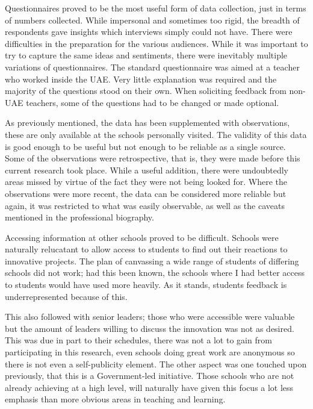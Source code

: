 Questionnaires proved to be the most useful form of data collection, just in terms of numbers collected. While impersonal and sometimes too rigid, the breadth of respondents gave insights which interviews simply could not have. There were difficulties in the preparation for the various audiences. While it was important to try to capture the same ideas and sentiments, there were inevitably multiple variations of questionnaires. The standard questionnaire was aimed at a teacher who worked inside the UAE. Very little explanation was required and the majority of the questions stood on their own. When soliciting feedback from non-UAE teachers, some of the questions had to be changed or made optional. 

As previously mentioned, the data has been supplemented with observations, these are only available at the schools personally visited. The validity of this data is good enough to be useful but not enough to be reliable as a single source. Some of the observations were retrospective, that is, they were made before this current research took place. While a useful addition, there were undoubtedly areas missed by virtue of the fact they were not being looked for. Where the observations were more recent, the data can be considered more reliable but again, it was restricted to what was easily observable, as well as the caveats mentioned in the professional biography.

Accessing information at other schools proved to be difficult. Schools were naturally relucatant to allow access to students to find out their reactions to innovative projects. The plan of canvassing a wide range of students of differing schools did not work; had this been known, the schools where I had better access to students would have used more heavily. As it stands, students feedback is underrepresented because of this. 

This also followed with senior leaders; those who were accessible were valuable but the amount of leaders willing to discuss the innovation was not as desired. This was due in part to their schedules, there was not a lot to gain from participating in this research, even schools doing great work are anonymous so there is not even a self-publicity element. The other aspect was one touched upon previously, that this is a Government-led initiative. Those schools who are not already achieving at a high level, will naturally have given this focus a lot less emphasis than more obvious areas in teaching and learning. 


